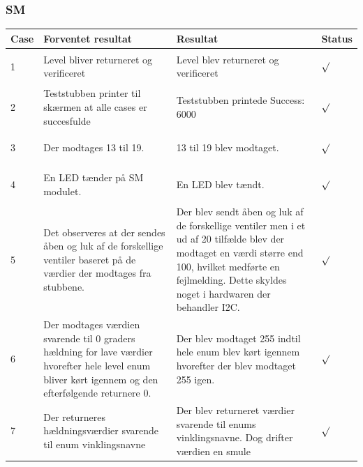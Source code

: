 \subsubsection{SM}
\begin{table}[H]
\centering
\begin{tabular}{| p{1cm}  | p{4cm} | p{6cm} | p{1cm} |}
\hline
Case &Forventet resultat &Resultat &Status\\\hline
1 &Level bliver returneret og verificeret &Level blev returneret og verificeret &\begin{Huge}$\surd$\end{Huge} \\\hline 
2 &Teststubben printer til skærmen at alle cases er succesfulde &Teststubben printede Success: 6000 &\begin{Huge}$\surd$\end{Huge} \\\hline
3 &Der modtages 13 til 19. &13 til 19 blev modtaget. &\begin{Huge}$\surd$\end{Huge} \\\hline
4 &En LED tænder på SM modulet. &En LED blev tændt. &\begin{Huge}$\surd$\end{Huge} \\\hline
5 &Det observeres at der sendes åben og luk af de forskellige ventiler baseret på de værdier der modtages fra stubbene. &Der blev sendt åben og luk af de forskellige ventiler men i et ud af 20 tilfælde blev der modtaget en værdi større end 100, hvilket medførte en fejlmelding. Dette skyldes noget i hardwaren der behandler I2C. &\begin{Huge}$\surd$\end{Huge} \\\hline
6 &Der modtages værdien svarende til 0 graders hældning for lave værdier hvorefter hele level enum bliver kørt igennem og den efterfølgende returnere 0. &Der blev modtaget 255 indtil hele enum blev kørt igennem hvorefter der blev modtaget 255 igen. &\begin{Huge}$\surd$\end{Huge} \\\hline
7 &Der returneres hældningsværdier svarende til enum vinklingsnavne &Der blev returneret værdier svarende til enums vinklingsnavne. Dog drifter værdien en smule&\begin{Huge}$\surd$\end{Huge} \\\hline
\end{tabular}
\end{table}
